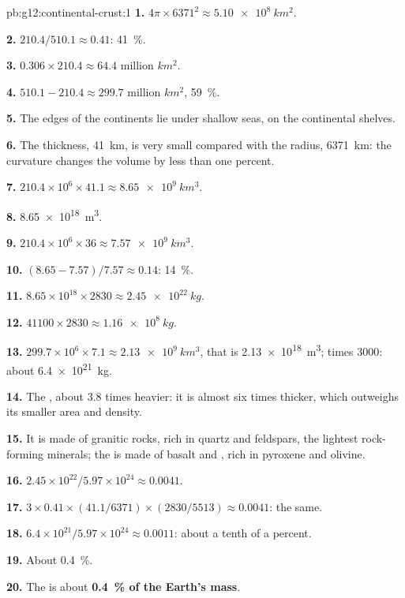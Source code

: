 \begin{solution}{pb:g12:continental-crust:1}
\textbf{1.} $4\pi \times 6371^2 \approx \qty{5.10e8}{km^2}$.

\textbf{2.} $210.4/510.1 \approx 0.41$: \qty{41}{\percent}.

\textbf{3.} $0.306 \times 210.4 \approx \num{64.4}\text{ million }\unit{km^2}$.

\textbf{4.} $510.1 - 210.4 \approx \num{299.7}\text{ million }\unit{km^2}$,
\qty{59}{\percent}.

\textbf{5.} The edges of the continents lie under shallow seas, on the
continental shelves.

\textbf{6.} The thickness, \qty{41}{km}, is very small compared with the
radius, \qty{6371}{km}: the curvature changes the volume by less than one
percent.

\textbf{7.} $210.4 \times 10^6 \times 41.1 \approx \qty{8.65e9}{km^3}$.

\textbf{8.} \qty{8.65e18}{m^3}.

\textbf{9.} $210.4 \times 10^6 \times 36 \approx \qty{7.57e9}{km^3}$.

\textbf{10.} $(8.65 - 7.57)/7.57 \approx 0.14$: \qty{14}{\percent}.

\textbf{11.} $8.65 \times 10^{18} \times 2830 \approx \qty{2.45e22}{kg}$.

\textbf{12.} $41100 \times 2830 \approx \qty{1.16e8}{kg}$.

\textbf{13.} $299.7 \times 10^6 \times 7.1 \approx \qty{2.13e9}{km^3}$, that
is \qty{2.13e18}{m^3}; times 3000: about \qty{6.4e21}{kg}.

\textbf{14.} The , about 3.8 times heavier: it is almost six
times thicker, which outweighs its smaller area and density.

\textbf{15.} It is made of granitic rocks, rich in quartz and feldspars, the
lightest rock-forming minerals; the  is made of basalt and
, rich in pyroxene and olivine.

\textbf{16.} $2.45 \times 10^{22}/5.97 \times 10^{24} \approx 0.0041$.

\textbf{17.} $3 \times 0.41 \times (41.1/6371) \times (2830/5513) \approx
0.0041$: the same.

\textbf{18.} $6.4 \times 10^{21}/5.97 \times 10^{24} \approx 0.0011$: about a
tenth of a percent.

\textbf{19.} About \qty{0.4}{\percent}.

\textbf{20.} The  is about \textbf{\qty{0.4}{\percent} of the
Earth's mass}.
\end{solution}
